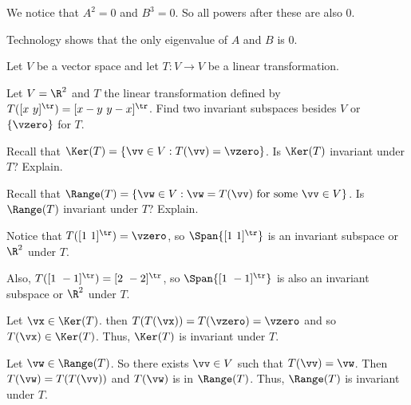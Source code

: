 \ActivitySolution
\ba
\item We notice that $A^2 = 0$ and $B^3 = 0$. So all powers after these are also 0. 

\item Technology shows that the only eigenvalue of $A$ and $B$ is 0.  

\ea
 

 \begin{activity} Let $V$ be a vector space and let $T : V \to V$ be a linear transformation. 
 \ba
  \item Let $V = \R^2$ and $T$ the linear transformation defined by $T([x \ y]^{\tr}) = [x-y \ y-x]^{\tr}$. Find two invariant subspaces besides $V$ or $\{\vzero\}$ for $T$.  
  
 \item Recall that $\Ker(T) = \{\vv \in V : T(\vv) = \vzero\}$. Is $\Ker(T)$ invariant under $T$? Explain.
 
 \item Recall that $\Range(T) = \{\vw \in V : \vw = T(\vv) \text{ for some } \vv \in V\}$. Is $\Range(T)$ invariant under $T$? Explain.
 
 \ea
 
 \end{activity}

\ActivitySolution
\ba
\item Notice that $T([1 \ 1]^{\tr}) = \vzero$, so $\Span\{[1 \ 1]^{\tr}\}$ is an invariant subspace or $\R^2$ under $T$.

Also, $T([1 \ -1]^{\tr}) = [2 \ -2]^{\tr}$, so $\Span\{[1 \ -1]^{\tr}\}$ is also an invariant subspace or $\R^2$ under $T$.
 
 \item Let $\vx \in \Ker(T)$. then $T(T(\vx)) = T(\vzero) = \vzero$ and so $T(\vx) \in \Ker(T)$. Thus, $\Ker(T)$ is invariant under $T$. 

\item Let $\vw \in \Range(T)$. So there exists $\vv \in V$ such that $T(\vv) = \vw$. Then $T(\vw) = T(T(\vv))$ and $T(\vw)$ is in $\Range(T)$. Thus, $\Range(T)$ is invariant under $T$.  
 
 \ea

